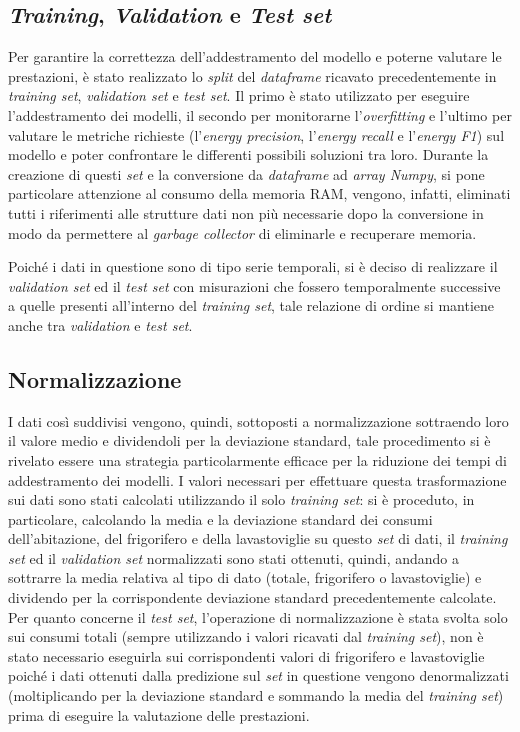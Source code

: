 \documentclass[12pt,a4paper,fleqn]{article}
\begin{document}
\subsection{\textsl{Training}, \textsl{Validation} e \textsl{Test set}}
Per garantire la correttezza dell'addestramento del modello e poterne valutare le prestazioni, è stato realizzato lo \textsl{split} del \textsl{dataframe} ricavato precedentemente in \textsl{training set}, \textsl{validation set} e \textsl{test set}. Il primo è stato utilizzato per eseguire l'addestramento dei modelli, il secondo per monitorarne l'\textsl{overfitting} e l'ultimo per valutare le metriche richieste (l'\textit{energy precision}, l'\textsl{energy recall} e l'\textsl{energy F1}) sul modello e poter confrontare le differenti possibili soluzioni tra loro. Durante la creazione di questi \textsl{set} e la conversione da \textsl{dataframe} ad \textsl{array Numpy}, si pone particolare attenzione al consumo della memoria RAM, vengono, infatti, eliminati tutti i riferimenti alle strutture dati non più necessarie dopo la conversione in modo da permettere al \textsl{garbage collector} di eliminarle e recuperare memoria.

Poiché i dati in questione sono di tipo serie temporali, si è deciso di realizzare il \textsl{validation set} ed il \textsl{test set} con misurazioni che fossero temporalmente successive a quelle presenti all'interno del \textsl{training set}, tale relazione di ordine si mantiene anche tra \textsl{validation} e \textsl{test set}.

\subsection{Normalizzazione}
I dati così suddivisi vengono, quindi, sottoposti a normalizzazione sottraendo loro il valore medio e dividendoli per la deviazione standard, tale procedimento si è rivelato essere una strategia particolarmente efficace per la riduzione dei tempi di addestramento dei modelli. I valori necessari per effettuare questa trasformazione sui dati sono stati calcolati utilizzando il solo \textsl{training set}: si è proceduto, in particolare, calcolando la media e la deviazione standard dei consumi dell'abitazione, del frigorifero e della lavastoviglie su questo \textsl{set} di dati, il \textsl{training set} ed il \textsl{validation set} normalizzati sono stati ottenuti, quindi, andando a sottrarre la media relativa al tipo di dato (totale, frigorifero o lavastoviglie) e dividendo per la corrispondente deviazione standard precedentemente calcolate. Per quanto concerne il \textsl{test set}, l'operazione di normalizzazione è stata svolta solo sui consumi totali (sempre utilizzando i valori ricavati dal \textsl{training set}), non è stato necessario eseguirla sui corrispondenti valori di frigorifero e lavastoviglie poiché i dati ottenuti dalla predizione sul \textsl{set} in questione vengono denormalizzati (moltiplicando per la deviazione standard e sommando la media del \textsl{training set}) prima di eseguire la valutazione delle prestazioni.
\end{document}

